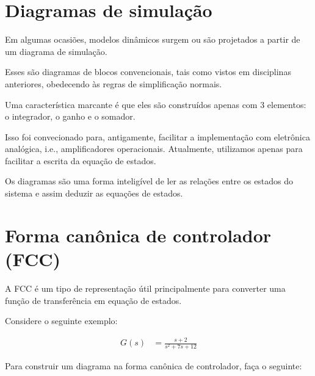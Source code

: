 \documentclass[
]{book}
\begin{document}
\hypertarget{diagramas-de-simulauxe7uxe3o}{%
\section{Diagramas de simulação}\label{diagramas-de-simulauxe7uxe3o}}

Em algumas ocasiões, modelos dinâmicos surgem ou são projetados a partir de um diagrama de simulação.

Esses são diagramas de blocos convencionais, tais como vistos em disciplinas anteriores, obedecendo às regras de simplificação normais.

Uma característica marcante é que eles são construídos apenas com 3 elementos: o integrador, o ganho e o somador.

Isso foi convecionado para, antigamente, facilitar a implementação com eletrônica analógica, i.e., amplificadores operacionais. Atualmente, utilizamos apenas para facilitar a escrita da equação de estados.

Os diagramas são uma forma inteligível de ler as relações entre os estados do sistema e assim deduzir as equações de estados.

\hypertarget{forma-canuxf4nica-de-controlador-fcc}{%
\section{Forma canônica de controlador (FCC)}\label{forma-canuxf4nica-de-controlador-fcc}}

A FCC é um tipo de representação útil principalmente para converter uma função de transferência em equação de estados.

Considere o seguinte exemplo:

\[
\begin{aligned}
G(s) &= \frac{s+2}{s^2+7s+12}
\end{aligned}
\]

Para construir um diagrama na forma canônica de controlador, faça o seguinte:
\end{document}
